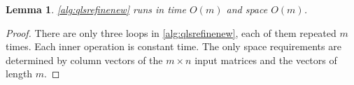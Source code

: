 \documentclass[a4paper,10pt,reqno]{amsart}
\newtheorem{lemma}{Lemma}
\theoremstyle{definition}
\begin{document}
\begin{lemma} 
\autoref{alg:qlsrefinenew} runs in time $O(m)$ and space $O(m)$.
\label{lem:qlsrefinenewruntime}
\end{lemma}
\begin{proof}
There are only three loops in \autoref{alg:qlsrefinenew}, each of them
repeated $m$ times. Each inner operation is constant time. The only space
requirements are determined by column vectors of the $m \times n $ input
matrices and the vectors of length $m$.
\end{proof}
\end{document}
